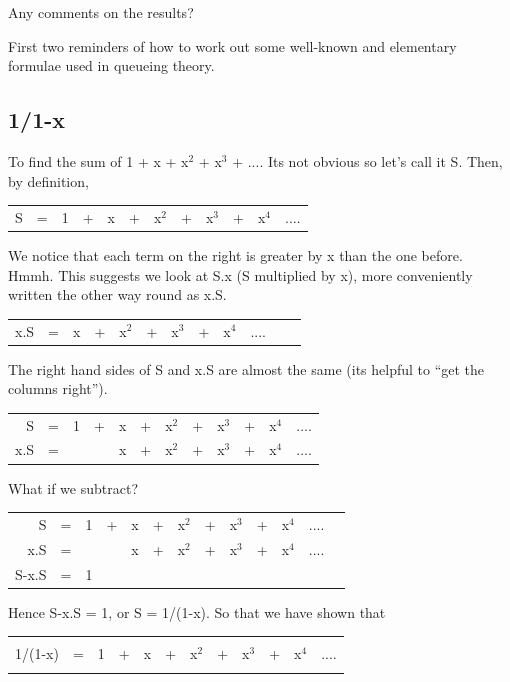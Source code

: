 Any comments on the results?

\newpage

First two reminders of how to work out some well-known 
and elementary formulae used in queueing theory.

\subsection{1/1-x}

To find the sum of 1 + x + x$^2$ + x$^3$ + ....
Its not obvious so let's call it S. Then, by definition,

\begin{tabular}{r cc cc cc cc ccc}
S & = & 1 & + & x & + & x$^2$ & + & x$^3$ & + & x$^4$ & .... \\
\end{tabular}

\noindent
We notice that each term on the right is greater by x than the one
before.
Hmmh. This suggests we look at  S.x (S multiplied by x), 
more conveniently written the other way round as x.S.

\begin{tabular}{r cc cc cc cc ccc}
x.S & = & x & + & x$^2$ & + & x$^3$ & + & x$^4$ &  .... \\
\end{tabular}

\noindent
The right hand sides of S and x.S are almost the same
(its helpful to ``get the columns right'').


\begin{tabular}{r cc cc cc cc ccc}
S   & = & 1 & + & x & + & x$^2$ & + & x$^3$ & + & x$^4$ & .... \\
x.S & = &   &   & x & + & x$^2$ & + & x$^3$ & + & x$^4$ &  .... \\
\end{tabular}


\noindent
What if we subtract? 

\begin{tabular}{r cc cc cc cc ccc c}
S   & = & 1 & + & x & + & x$^2$ & + & x$^3$ & + & x$^4$ & .... \\
x.S & = &   &   & x & + & x$^2$ & + & x$^3$ & + & x$^4$ &  .... \\
\hline
S-x.S & = & 1 & \\
\hline
\end{tabular}

\noindent
Hence  S-x.S = 1, or S = 1/(1-x). So that we have shown that

\begin{table}[hbt]\centering
\begin{tabular}{||r cc cc cc cc ccc||}
\hline
&&&&&&&&&&&\\
\hspace*{0.25in}
1/(1-x)
  & = & 
1 & + & x & + & x$^2$ & + & x$^3$ & + & x$^4$ & .... 
\hspace*{0.25in}\\
&&&&&&&&&&&\\
\hline
\end{tabular}
\end{table}


